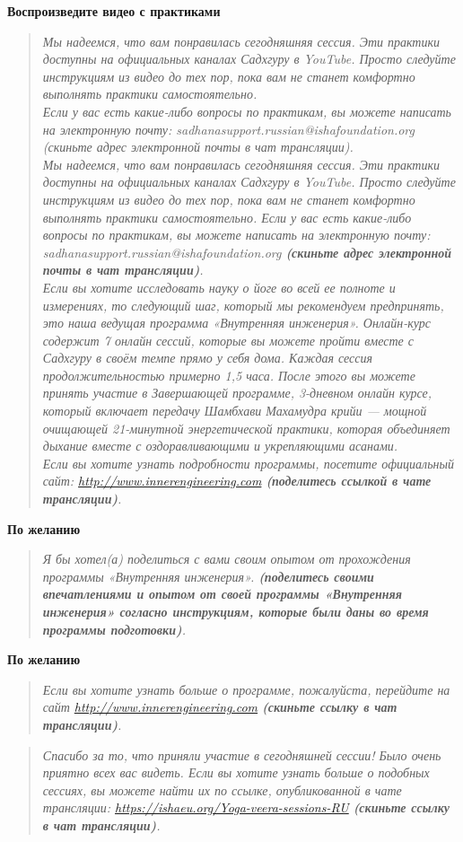 \textbf{Воспроизведите видео с практиками}
\begin{quote}\emph{
Мы надеемся, что вам понравилась сегодняшняя сессия. Эти практики
доступны на официальных каналах Садхгуру в YouTube. Просто следуйте
инструкциям из видео до тех пор, пока вам не станет комфортно выполнять
практики самостоятельно.
\\
Если у вас есть какие-либо вопросы по практикам, вы можете написать на
электронную почту: sadhanasupport.russian@ishafoundation.org (скиньте
адрес электронной почты в чат трансляции).
\\
Мы надеемся, что вам понравилась сегодняшняя сессия. Эти практики
доступны на официальных каналах Садхгуру в YouTube. Просто следуйте
инструкциям из видео до тех пор, пока вам не станет комфортно выполнять
практики самостоятельно.
Если у вас есть какие-либо вопросы по практикам, вы можете написать на
электронную почту: sadhanasupport.russian@ishafoundation.org \textbf{(скиньте адрес электронной почты в чат трансляции)}.
\\
Если вы хотите исследовать науку о йоге во всей ее полноте и измерениях,
то следующий шаг, который мы рекомендуем предпринять, это наша
ведущая программа «Внутренняя инженерия». Онлайн-курс содержит 7
онлайн сессий, которые вы можете пройти вместе с Садхгуру в своём
темпе прямо у себя дома. Каждая сессия продолжительностью примерно
1,5 часа. После этого вы можете принять участие в Завершающей
программе, 3-дневном онлайн курсе, который включает передачу
Шамбхави Махамудра крийи — мощной очищающей 21-минутной
энергетической практики, которая объединяет дыхание вместе с
оздоравливающими и укрепляющими асанами.
\\
Если вы хотите узнать подробности программы, посетите официальный
сайт: \href{http://www.innerengineering.com}{\small http://www.innerengineering.com} \textbf{(поделитесь ссылкой в чате трансляции)}.
}\end{quote}

\textbf{По желанию}
\begin{quote}\emph{
Я бы хотел(а) поделиться с вами своим опытом от прохождения программы «Внутренняя инженерия».
\textbf{(поделитесь своими впечатлениями и опытом от своей программы
«Внутренняя инженерия» согласно инструкциям, которые были даны во
время программы подготовки)}.
}\end{quote}

\textbf{По желанию}
\begin{quote}\emph{
Если вы хотите узнать больше о программе, пожалуйста, перейдите на сайт \href{http://www.innerengineering.com}{\small http://www.innerengineering.com} \textbf{(скиньте ссылку в чат трансляции)}. 
}\end{quote}

\begin{quote}\emph{
Спасибо за то, что приняли участие в сегодняшней сессии! Было очень приятно всех вас видеть. Если вы хотите узнать больше о подобных сессиях, вы можете найти их по ссылке, опубликованной в чате трансляции: \href{https://ishaeu.org/Yoga-veera-sessions-RU}{\small https://ishaeu.org/Yoga-veera-sessions-RU} \textbf{(скиньте ссылку в чат трансляции)}. 
}\end{quote}

